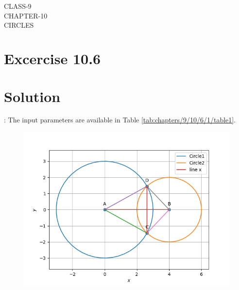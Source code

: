 \documentclass[12pt]{article}
\begin{document}
\begin{center}
\textbf\large{CLASS-9\\CHAPTER-10 \\ CIRCLES}

\end{center}
\section*{Excercise 10.6}

\section*{\large Solution}:
\fi
The input parameters are available in Table 
	\ref{tab:chapters/9/10/6/1/table1}.
\begin{figure}[h!]
\centering
\includegraphics[width=\columnwidth]{chapters/9/10/6/1/figs/circle3.png}
\caption{}
\label{fig:chapters/9/10/6/1/Fig1}
\end{figure}
\end{document}
